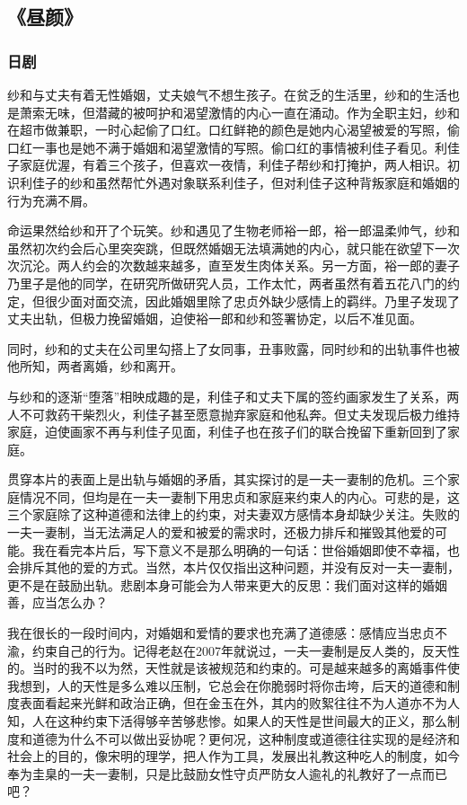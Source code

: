 \subsection{《昼颜》}

\subsubsection{日剧}
纱和与丈夫有着无性婚姻，丈夫娘气不想生孩子。在贫乏的生活里，纱和的生活也是萧索无味，但潜藏的被呵护和渴望激情的内心一直在涌动。作为全职主妇，纱和在超市做兼职，一时心起偷了口红。口红鲜艳的颜色是她内心渴望被爱的写照，偷口红一事也是她不满于婚姻和渴望激情的写照。偷口红的事情被利佳子看见。利佳子家庭优渥，有着三个孩子，但喜欢一夜情，利佳子帮纱和打掩护，两人相识。初识利佳子的纱和虽然帮忙外遇对象联系利佳子，但对利佳子这种背叛家庭和婚姻的行为充满不屑。

命运果然给纱和开了个玩笑。纱和遇见了生物老师裕一郎，裕一郎温柔帅气，纱和虽然初次约会后心里突突跳，但既然婚姻无法填满她的内心，就只能在欲望下一次次沉沦。两人约会的次数越来越多，直至发生肉体关系。另一方面，裕一郎的妻子乃里子是他的同学，在研究所做研究人员，工作太忙，两者虽然有着五花八门的约定，但很少面对面交流，因此婚姻里除了忠贞外缺少感情上的羁绊。乃里子发现了丈夫出轨，但极力挽留婚姻，迫使裕一郎和纱和签署协定，以后不准见面。

同时，纱和的丈夫在公司里勾搭上了女同事，丑事败露，同时纱和的出轨事件也被他所知，两者离婚，纱和离开。

与纱和的逐渐“堕落”相映成趣的是，利佳子和丈夫下属的签约画家发生了关系，两人不可救药干柴烈火，利佳子甚至愿意抛弃家庭和他私奔。但丈夫发现后极力维持家庭，迫使画家不再与利佳子见面，利佳子也在孩子们的联合挽留下重新回到了家庭。

贯穿本片的表面上是出轨与婚姻的矛盾，其实探讨的是一夫一妻制的危机。三个家庭情况不同，但均是在一夫一妻制下用忠贞和家庭来约束人的内心。可悲的是，这三个家庭除了这种道德和法律上的约束，对夫妻双方感情本身却缺少关注。失败的一夫一妻制，当无法满足人的爱和被爱的需求时，还极力排斥和摧毁其他爱的可能。我在看完本片后，写下意义不是那么明确的一句话：世俗婚姻即使不幸福，也会排斥其他的爱的方式。当然，本片仅仅指出这种问题，并没有反对一夫一妻制，更不是在鼓励出轨。悲剧本身可能会为人带来更大的反思：我们面对这样的婚姻善，应当怎么办？

我在很长的一段时间内，对婚姻和爱情的要求也充满了道德感：感情应当忠贞不渝，约束自己的行为。记得老赵在2007年就说过，一夫一妻制是反人类的，反天性的。当时的我不以为然，天性就是该被规范和约束的。可是越来越多的离婚事件使我想到，人的天性是多么难以压制，它总会在你脆弱时将你击垮，后天的道德和制度表面看起来光鲜和政治正确，但在金玉在外，其内的败絮往往不为人道亦不为人知，人在这种约束下活得够辛苦够悲惨。如果人的天性是世间最大的正义，那么制度和道德为什么不可以做出妥协呢？更何况，这种制度或道德往往实现的是经济和社会上的目的，像宋明的理学，把人作为工具，发展出礼教这种吃人的制度，如今奉为圭臬的一夫一妻制，只是比鼓励女性守贞严防女人逾礼的礼教好了一点而已吧？

